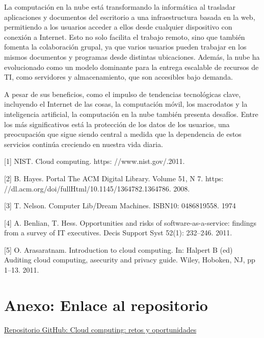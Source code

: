 \documentclass[a4paper,10pt]{article}
\begin{document}
La computación en la nube está transformando la informática al trasladar aplicaciones y documentos del escritorio a una infraestructura basada en la web, permitiendo a los usuarios acceder a ellos desde cualquier dispositivo con conexión a Internet. Esto no solo facilita el trabajo remoto, sino que también fomenta la colaboración grupal, ya que varios usuarios pueden trabajar en los mismos documentos y programas desde distintas ubicaciones. Además, la nube ha evolucionado como un modelo dominante para la entrega escalable de recursos de TI, como servidores y almacenamiento, que son accesibles bajo demanda.

A pesar de sus beneficios, como el impulso de tendencias tecnológicas clave, incluyendo el Internet de las cosas, la computación móvil, los macrodatos y la inteligencia artificial, la computación en la nube también presenta desafíos. Entre los más significativos está la protección de los datos de los usuarios, una preocupación que sigue siendo central a medida que la dependencia de estos servicios continúa creciendo en nuestra vida diaria.


% 



[1] NIST. Cloud computing. https: //www.nist.gov/.2011.

[2] B. Hayes. Portal The ACM Digital Library. Volume 51, N 7. https: //dl.acm.org/doi/fullHtml/10.1145/1364782.1364786. 2008.

[3] T. Nelson. Computer Lib/Dream Machines. ISBN10: 0486819558. 1974

[4] A. Benlian, T. Hess. Opportunities and risks of software-as-a-service: findings from a survey of IT executives. Decis Support Syst 52(1): 232–246. 2011.

[5] O. Arasaratnam. Introduction to cloud computing. In: Halpert B (ed) Auditing cloud computing, asecurity and privacy guide. Wiley, Hoboken, NJ,
pp 1–13. 2011.

\section *{Anexo: Enlace al repositorio }
 \href{}{Repositorio GitHub: Cloud computing: retos y oportunidades}
\end{document}
